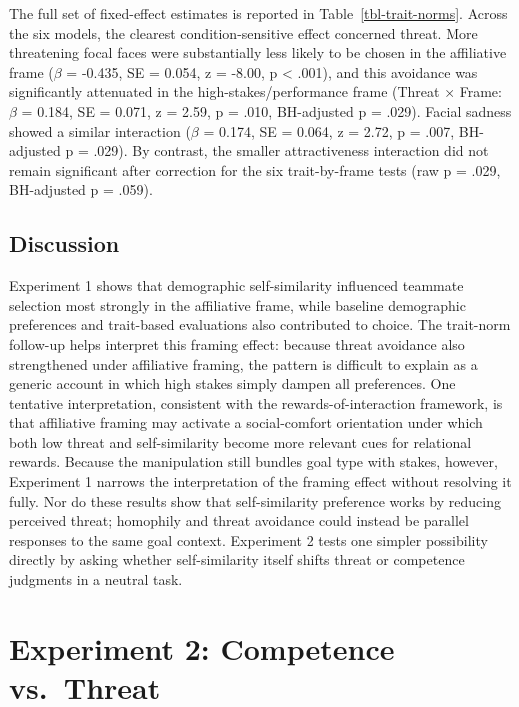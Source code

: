 \documentclass[
  man,
  floatsintext,
  longtable,
  nolmodern,
  notxfonts,
  notimes,
  draftfirst,
  colorlinks=true,linkcolor=blue,citecolor=blue,urlcolor=blue]{apa7}
\begin{document}
The full set of fixed-effect estimates is reported in
Table~\ref{tbl-trait-norms}. Across the six models, the clearest
condition-sensitive effect concerned threat. More threatening focal
faces were substantially less likely to be chosen in the affiliative
frame (\(\beta\) = -0.435, SE = 0.054, z = -8.00, p \textless{} .001),
and this avoidance was significantly attenuated in the
high-stakes/performance frame (Threat × Frame: \(\beta\) = 0.184, SE =
0.071, z = 2.59, p = .010, BH-adjusted p = .029). Facial sadness showed
a similar interaction (\(\beta\) = 0.174, SE = 0.064, z = 2.72, p =
.007, BH-adjusted p = .029). By contrast, the smaller attractiveness
interaction did not remain significant after correction for the six
trait-by-frame tests (raw p = .029, BH-adjusted p = .059).

\subsection{Discussion}\label{discussion}

Experiment 1 shows that demographic self-similarity influenced teammate
selection most strongly in the affiliative frame, while baseline
demographic preferences and trait-based evaluations also contributed to
choice. The trait-norm follow-up helps interpret this framing effect:
because threat avoidance also strengthened under affiliative framing,
the pattern is difficult to explain as a generic account in which high
stakes simply dampen all preferences. One tentative interpretation,
consistent with the rewards-of-interaction framework, is that
affiliative framing may activate a social-comfort orientation under
which both low threat and self-similarity become more relevant cues for
relational rewards. Because the manipulation still bundles goal type
with stakes, however, Experiment 1 narrows the interpretation of the
framing effect without resolving it fully. Nor do these results show
that self-similarity preference works by reducing perceived threat;
homophily and threat avoidance could instead be parallel responses to
the same goal context. Experiment 2 tests one simpler possibility
directly by asking whether self-similarity itself shifts threat or
competence judgments in a neutral task.

\section{Experiment 2: Competence
vs.~Threat}\label{experiment-2-competence-vs.-threat}
\end{document}
